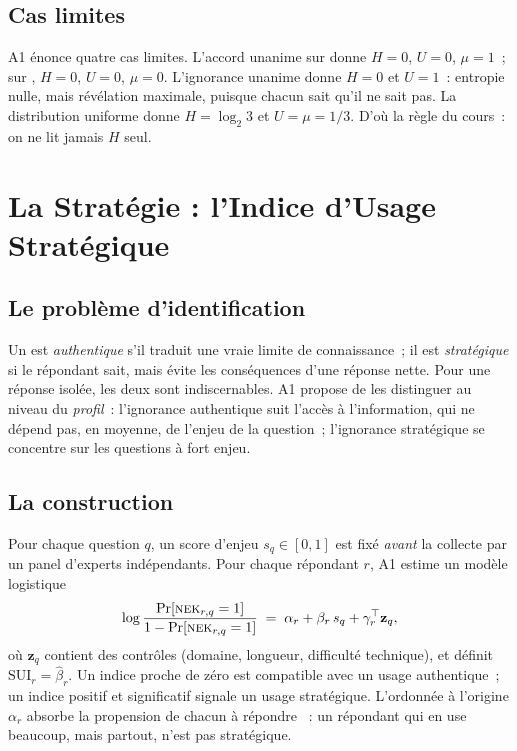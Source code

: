 \subsection{Cas limites}

A1 énonce quatre cas limites. L'accord unanime sur \OUI{} donne $H = 0$,
$U = 0$, $\mu = 1$~; sur \NON{}, $H = 0$, $U = 0$, $\mu = 0$. L'ignorance
unanime donne $H = 0$ et $U = 1$~: entropie nulle, mais révélation
maximale, puisque chacun sait qu'il ne sait pas. La distribution uniforme
donne $H = \log_2 3$ et $U = \mu = 1/3$. D'où la règle du cours~: on ne
lit jamais $H$ seul.

\section{La Stratégie : l'Indice d'Usage Stratégique}
\label{sec:c22-sui}

\subsection{Le problème d'identification}

Un \NEK{} est \emph{authentique} s'il traduit une vraie limite de
connaissance~; il est \emph{stratégique} si le répondant sait, mais évite
les conséquences d'une réponse nette. Pour une réponse isolée, les deux
sont indiscernables. A1 propose de les distinguer au niveau du
\emph{profil}~: l'ignorance authentique suit l'accès à l'information, qui
ne dépend pas, en moyenne, de l'enjeu de la question~; l'ignorance
stratégique se concentre sur les questions à fort enjeu.

\subsection{La construction}

Pour chaque question $q$, un score d'enjeu $s_q \in [0, 1]$ est fixé
\emph{avant} la collecte par un panel d'experts indépendants. Pour chaque
répondant $r$, A1 estime un modèle logistique
\[
    \log \frac{\Pr[\textsc{nek}{}_{r,q} = 1]}{1 - \Pr[\textsc{nek}{}_{r,q} = 1]}
    \;=\; \alpha_r + \beta_r\, s_q + \gamma_r^{\top} \mathbf{z}_q,
\]
où $\mathbf{z}_q$ contient des contrôles (domaine, longueur, difficulté
technique), et définit $\mathrm{SUI}_r = \hat\beta_r$. Un indice proche de
zéro est compatible avec un usage authentique~; un indice positif et
significatif signale un usage stratégique. L'ordonnée à l'origine
$\alpha_r$ absorbe la propension de chacun à répondre \NEK{}~: un
répondant qui en use beaucoup, mais partout, n'est pas stratégique.

